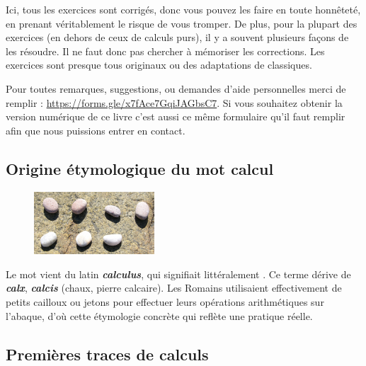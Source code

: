 Ici, tous les exercices sont corrigés, donc vous pouvez les faire en toute honnêteté, en prenant véritablement le risque de vous tromper. De plus, pour la plupart des exercices (en dehors de ceux de calculs purs), il y a souvent plusieurs façons de les résoudre. Il ne faut donc pas chercher à mémoriser les corrections. Les exercices sont presque tous originaux ou des adaptations de classiques.

\newpage

Pour toutes remarques, suggestions, ou demandes d'aide personnelles merci de remplir  : \url{https://forms.gle/x7fAce7GqiJAGbsC7}. Si vous souhaitez obtenir la version numérique de ce livre c'est aussi ce même formulaire qu'il faut remplir afin que nous puissions entrer en contact.

\newpage 

\subsection{Origine étymologique du mot calcul}

\begin{figure} %
    \vspace{-0.75cm} %
    \includegraphics[width=0.4\textwidth]{../images/Cailloux.jpeg}
\end{figure}

Le mot  vient du latin \textbf{\textit{calculus}}, qui signifiait littéralement . Ce terme dérive de \textbf{\textit{calx}}, \textbf{\textit{calcis}} (chaux, pierre calcaire). Les Romains utilisaient effectivement de petits cailloux ou jetons pour effectuer leurs opérations arithmétiques sur l'abaque, d'où cette étymologie concrète qui reflète une pratique réelle. 

\newpage 

\subsection{Premières traces de calculs}

